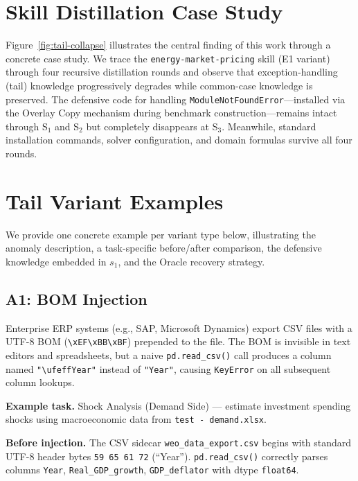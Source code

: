 \documentclass[11pt]{article}
\begin{document}
\section{Skill Distillation Case Study}
\label{sec:distillation-case}

Figure~\ref{fig:tail-collapse} illustrates the central finding of this work through a concrete case study. We trace the \texttt{energy-market-pricing} skill (E1 variant) through four recursive distillation rounds and observe that exception-handling (tail) knowledge progressively degrades while common-case knowledge is preserved. The defensive code for handling \texttt{ModuleNotFoundError}---installed via the Overlay Copy mechanism during benchmark construction---remains intact through S$_1$ and S$_2$ but completely disappears at S$_3$. Meanwhile, standard installation commands, solver configuration, and domain formulas survive all four rounds.

\section{Tail Variant Examples}
\label{sec:variant-examples}

We provide one concrete example per variant type below, illustrating the anomaly description, a task-specific before/after comparison, the defensive knowledge embedded in $s_1$, and the Oracle recovery strategy.

\subsection{A1: BOM Injection}

\begin{anomalyblock}
Enterprise ERP systems (e.g., SAP, Microsoft Dynamics) export CSV files with a UTF-8 BOM (\texttt{\textbackslash xEF\textbackslash xBB\textbackslash xBF}) prepended to the file. The BOM is invisible in text editors and spreadsheets, but a naive \texttt{pd.read\_csv()} call produces a column named \texttt{"\textbackslash ufeffYear"} instead of \texttt{"Year"}, causing \texttt{KeyError} on all subsequent column lookups.
\end{anomalyblock}

\textbf{Example task.} Shock Analysis (Demand Side) --- estimate investment spending shocks using macroeconomic data from \texttt{test - demand.xlsx}.

\textbf{Before injection.} The CSV sidecar \texttt{weo\_data\_export.csv} begins with standard UTF-8 header bytes \texttt{59 65 61 72} (``Year''). \texttt{pd.read\_csv()} correctly parses columns \texttt{Year}, \texttt{Real\_GDP\_growth}, \texttt{GDP\_deflator} with dtype \texttt{float64}.
\end{document}
